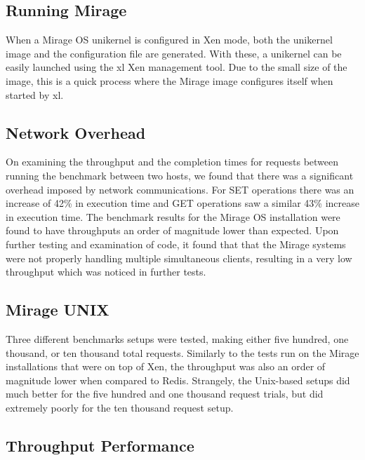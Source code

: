 \documentclass[english,10pt,twocolumn]{article}
\begin{document}
\subsection{Running Mirage}

When a Mirage OS unikernel is configured in Xen mode, both the unikernel image and the configuration file are generated.
With these, a unikernel can be easily launched using the xl Xen management tool.
Due to the small size of the image, this is a quick process where the Mirage image configures itself when started by xl.


\subsection{Network Overhead}

On examining the throughput and the completion times for requests between running the benchmark between two hosts, we found that there was a significant overhead imposed by network communications. For SET operations there was an increase of 42\% in execution time and GET operations saw a similar 43\% increase in execution time.
The benchmark results for the Mirage OS installation were found to have throughputs an order of magnitude lower than expected.
Upon further testing and examination of code, it found that that the Mirage systems were not properly handling multiple simultaneous clients, resulting in a very low throughput which was noticed in further tests.


\subsection{Mirage \- UNIX}

Three different benchmarks setups were tested, making either five hundred, one thousand, or ten thousand total requests.
Similarly to the tests run on the Mirage installations that were on top of Xen, the throughput was also an order of magnitude lower when compared to Redis. 
Strangely, the Unix-based setups did much better for the five hundred and one thousand request trials, but did extremely poorly for the ten thousand request setup.

\subsection{Throughput Performance}
\end{document}
